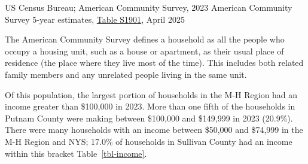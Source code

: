 \documentclass[
  english,
  letterpaper,
]{report}
\begin{document}
\begin{tcolorbox}[enhanced jigsaw, breakable, leftrule=.75mm, title=\textcolor{quarto-callout-note-color}{\faInfo}\hspace{0.5em}{Source}, bottomrule=.15mm, opacityback=0, left=2mm, colback=white, bottomtitle=1mm, coltitle=black, colbacktitle=quarto-callout-note-color!10!white, colframe=quarto-callout-note-color-frame, opacitybacktitle=0.6, toptitle=1mm, titlerule=0mm, arc=.35mm, rightrule=.15mm, toprule=.15mm]

US Census Bureau; American Community Survey, 2023 American Community
Survey 5-year estimates,
\href{https://data.census.gov/table/ACSST5Y2023.S1901?q=s1901&g=050XX00US36105,36027,36071,36119,36087,36079,36111_160XX00US3651000_040XX00US36}{Table
S1901}, April 2025

\end{tcolorbox}

\begin{tcolorbox}[enhanced jigsaw, breakable, leftrule=.75mm, title=\textcolor{quarto-callout-note-color}{\faInfo}\hspace{0.5em}{Note}, bottomrule=.15mm, opacityback=0, left=2mm, colback=white, bottomtitle=1mm, coltitle=black, colbacktitle=quarto-callout-note-color!10!white, colframe=quarto-callout-note-color-frame, opacitybacktitle=0.6, toptitle=1mm, titlerule=0mm, arc=.35mm, rightrule=.15mm, toprule=.15mm]

The American Community Survey defines a household as all the people who
occupy a housing unit, such as a house or apartment, as their usual
place of residence (the place where they live most of the time). This
includes both related family members and any unrelated people living in
the same unit.

\end{tcolorbox}

Of this population, the largest portion of households in the M-H Region
had an income greater than \$100,000 in 2023. More than one fifth of the
households in Putnam County were making between \$100,000 and \$149,999
in 2023 (20.9\%). There were many households with an income between
\$50,000 and \$74,999 in the M-H Region and NYS; 17.0\% of households in
Sullivan County had an income within this bracket
Table~\ref{tbl-income}.
\end{document}
